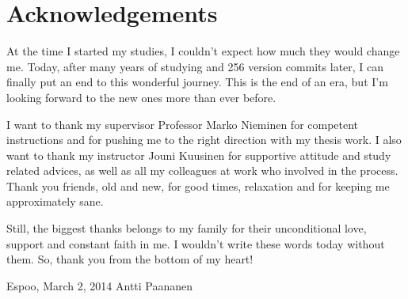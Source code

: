 \documentclass[12pt,a4paper,oneside,pdftex]{report}
\newcommand{\DATE}{March 2, 2014}
\newcommand{\AUTHOR}{Antti Paananen}
\begin{document}




\chapter*{Acknowledgements}

At the time I started my studies, I couldn't expect how much they would change me.
Today, after many years of studying and 256 version commits later, I can finally put an end to this wonderful journey.
This is the end of an era, but I'm looking forward to the new ones more than ever before.

I want to thank my supervisor Professor Marko Nieminen for competent instructions and for pushing me to the right direction with my thesis work. 
I also want to thank my instructor Jouni Kuusinen for supportive attitude and study related advices, as well as all my colleagues at work who involved in the process.
Thank you friends, old and new, for good times, relaxation and for keeping me approximately sane.

Still, the biggest thanks belongs to my family for their unconditional love, support and constant faith in me. I wouldn't write these words today without them.
So, thank you from the bottom of my heart! 

\vskip 10mm

\noindent Espoo, \DATE
\vskip 5mm
\noindent\AUTHOR

\cleardoublepage
% 
\end{document}
